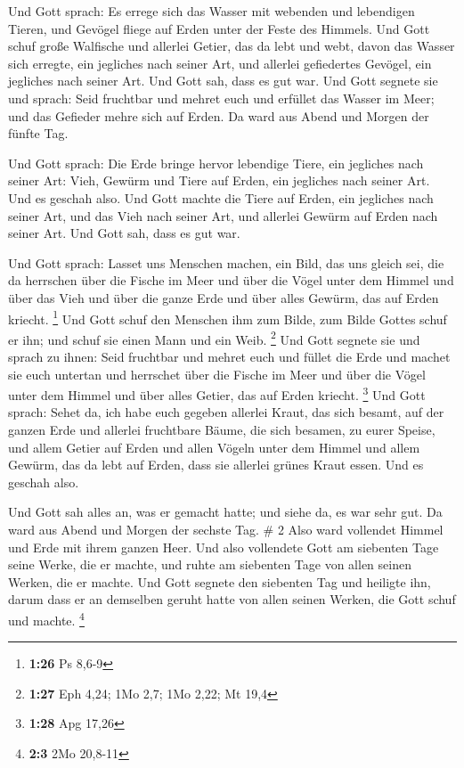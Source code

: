  Und Gott sprach: Es errege sich das Wasser mit webenden
und lebendigen Tieren, und Gevögel fliege auf Erden unter der Feste des
Himmels.  Und Gott schuf große Walfische und allerlei
Getier, das da lebt und webt, davon das Wasser sich erregte, ein
jegliches nach seiner Art, und allerlei gefiedertes Gevögel, ein
jegliches nach seiner Art. Und Gott sah, dass es gut war. 
Und Gott segnete sie und sprach: Seid fruchtbar und mehret euch und
erfüllet das Wasser im Meer; und das Gefieder mehre sich auf Erden.
 Da ward aus Abend und Morgen der fünfte Tag.

 Und Gott sprach: Die Erde bringe hervor lebendige Tiere,
ein jegliches nach seiner Art: Vieh, Gewürm und Tiere auf Erden, ein
jegliches nach seiner Art. Und es geschah also.  Und Gott
machte die Tiere auf Erden, ein jegliches nach seiner Art, und das Vieh
nach seiner Art, und allerlei Gewürm auf Erden nach seiner Art. Und Gott
sah, dass es gut war.

 Und Gott sprach: Lasset uns Menschen machen, ein Bild, das
uns gleich sei, die da herrschen über die Fische im Meer und über die
Vögel unter dem Himmel und über das Vieh und über die ganze Erde und
über alles Gewürm, das auf Erden kriecht. \footnote{\textbf{1:26} Ps
  8,6-9}  Und Gott schuf den Menschen ihm zum Bilde, zum
Bilde Gottes schuf er ihn; und schuf sie einen Mann und ein Weib.
\footnote{\textbf{1:27} Eph 4,24; 1Mo 2,7; 1Mo 2,22; Mt 19,4}
 Und Gott segnete sie und sprach zu ihnen: Seid fruchtbar
und mehret euch und füllet die Erde und machet sie euch untertan und
herrschet über die Fische im Meer und über die Vögel unter dem Himmel
und über alles Getier, das auf Erden kriecht. \footnote{\textbf{1:28}
  Apg 17,26}  Und Gott sprach: Sehet da, ich habe euch
gegeben allerlei Kraut, das sich besamt, auf der ganzen Erde und
allerlei fruchtbare Bäume, die sich besamen, zu eurer Speise,
 und allem Getier auf Erden und allen Vögeln unter dem
Himmel und allem Gewürm, das da lebt auf Erden, dass sie allerlei grünes
Kraut essen. Und es geschah also.

 Und Gott sah alles an, was er gemacht hatte; und siehe da,
es war sehr gut. Da ward aus Abend und Morgen der sechste Tag. \# 2
 Also ward vollendet Himmel und Erde mit ihrem ganzen Heer.
 Und also vollendete Gott am siebenten Tage seine Werke, die
er machte, und ruhte am siebenten Tage von allen seinen Werken, die er
machte.  Und Gott segnete den siebenten Tag und heiligte
ihn, darum dass er an demselben geruht hatte von allen seinen Werken,
die Gott schuf und machte. \footnote{\textbf{2:3} 2Mo 20,8-11}


